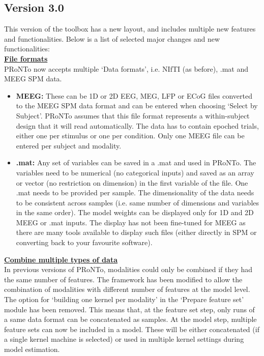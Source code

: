 \subsection{Version 3.0}
\label{ssec:whats_new_v3}

This version of the toolbox has a new layout, and includes multiple new features and functionalities. Below is a list of selected major changes and new functionalities:
\\

\noindent \underline{\textbf{File formats}}
\\

PRoNTo now accepts multiple `Data formats', i.e. NIfTI (as before), .mat and MEEG SPM data.

\begin{itemize}

\item \textbf{MEEG:} These can be 1D or 2D EEG, MEG, LFP or ECoG files converted to the MEEG SPM data format and can be entered when choosing `Select by Subject'. PRoNTo assumes that this file format represents a within-subject design that it will read automatically. The data has to contain epoched trials, either one per stimulus or one per condition. Only one MEEG file can be entered per subject and modality.

\item \textbf{.mat:} Any set of variables can be saved in a .mat and used in PRoNTo. The variables need to be numerical (no categorical inputs) and saved as an array or vector (no restriction on dimension) in the first variable of the file. One .mat needs to be provided per sample. The dimensionality of the data needs to be consistent across samples (i.e. same number of dimensions and variables in the same order). The model weights can be displayed only for 1D and 2D MEEG or .mat inputs. The display has not been fine-tuned for MEEG as there are many tools available to display such files (either directly in SPM or converting back to your favourite software).

\end{itemize}

\noindent \underline{\textbf{Combine multiple types of data}}
\\

In previous versions of PRoNTo, modalities could only be combined if they had the same number of features. The framework has been modified to allow the combination of modalities with different number of features at the model level. The option for `building one kernel per modality' in the `Prepare feature set' module has been removed. This means that, at the feature set step, only runs of a same data format can be concatenated as samples. At the model step, multiple feature sets can now be included in a model. These will be either concatenated (if a single kernel machine is selected) or used in multiple kernel settings during model estimation.
\\

